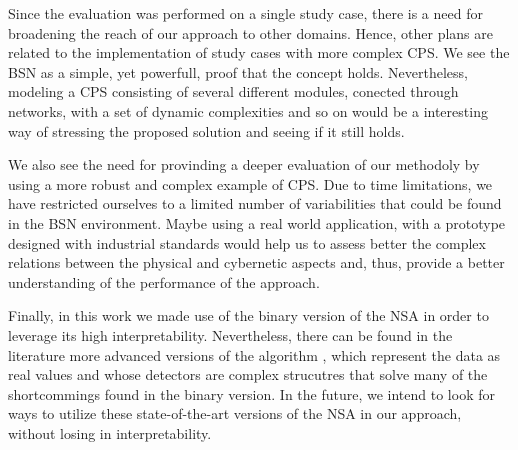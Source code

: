 Since the evaluation was performed on a single study case, there is a need for broadening the reach of our approach to other domains. Hence, other plans are related to the implementation of study cases with more complex CPS. We see the BSN as a simple, yet powerfull, proof that the concept holds. Nevertheless, modeling a CPS consisting of several different modules, conected through networks, with a set of dynamic complexities and so on would be a interesting way of stressing the proposed solution and seeing if it still holds. 

We also see the need for provinding a deeper evaluation of our methodoly by using a more robust and complex example of CPS. Due to time limitations, we have restricted ourselves to a limited number of variabilities that could be found in the BSN environment. Maybe using a real world application, with a prototype designed with industrial standards would help us to assess better the complex relations between the physical and cybernetic aspects and, thus, provide a better understanding of the performance of the approach.

Finally, in this work we made use of the binary version of the NSA in order to leverage its high interpretability. Nevertheless, there can be found in the literature more advanced versions of the algorithm \cite{NSAResearch2021}, which represent the data as real values and whose detectors are complex strucutres that solve many of the shortcommings found in the binary version. In the future, we intend to look for ways to utilize these state-of-the-art versions of the NSA in our approach, without losing in interpretability.  